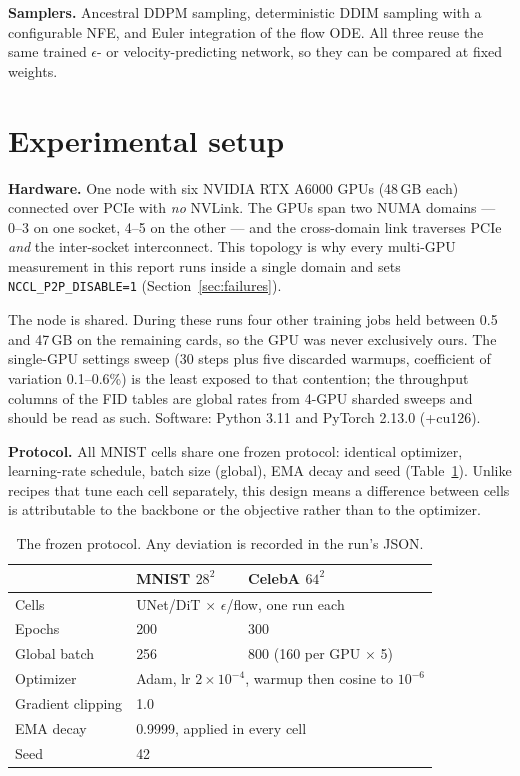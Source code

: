 \documentclass{article}
\begin{document}
\textbf{Samplers.} Ancestral DDPM sampling, deterministic DDIM sampling with a configurable
NFE, and Euler integration of the flow ODE. All three reuse the same trained \(\epsilon\)- or
velocity-predicting network, so they can be compared at fixed weights.

\section{Experimental setup}
\label{sec:setup}

\textbf{Hardware.} One node with six NVIDIA RTX A6000 GPUs (48\,GB each) connected over
PCIe with \emph{no} NVLink. The GPUs span two NUMA domains --- 0--3 on one socket, 4--5 on
the other --- and the cross-domain link traverses PCIe \emph{and} the inter-socket
interconnect. This topology is why every multi-GPU measurement in this report runs inside a
single domain and sets \texttt{NCCL\_P2P\_DISABLE=1} (Section~\ref{sec:failures}).

The node is shared. During these runs four other training jobs held between 0.5 and 47\,GB on
the remaining cards, so the GPU was never exclusively ours. The single-GPU settings sweep (30
steps plus five discarded warmups, coefficient of variation 0.1--0.6\%) is the least exposed to
that contention; the throughput columns of the FID tables are global rates from 4-GPU sharded
sweeps and should be read as such. Software: Python 3.11 and PyTorch 2.13.0 (+cu126).

\textbf{Protocol.} All MNIST cells share one frozen protocol: identical optimizer,
learning-rate schedule, batch size (global), EMA decay and seed (Table~\ref{tab:protocol}).
Unlike recipes that tune each cell separately, this design means a difference between cells
is attributable to the backbone or the objective rather than to the optimizer.

\begin{table}[t]
  \caption{The frozen protocol. Any deviation is recorded in the run's JSON.}
  \label{tab:protocol}
  \centering
  \small
  \begin{tabular}{@{}lll@{}}
    \toprule
    & MNIST $28^2$ & CelebA $64^2$ \\
    \midrule
    Cells & \multicolumn{2}{l}{UNet/DiT $\times$ $\epsilon$/flow, one run each} \\
    Epochs & 200 & 300 \\
    Global batch & 256 & 800 (160 per GPU $\times$ 5) \\
    Optimizer & \multicolumn{2}{l}{Adam, lr $2\times10^{-4}$, warmup then cosine to $10^{-6}$} \\
    Gradient clipping & \multicolumn{2}{l}{1.0} \\
    EMA decay & \multicolumn{2}{l}{0.9999, applied in every cell} \\
    Seed & \multicolumn{2}{l}{42} \\
    \bottomrule
  \end{tabular}
\end{table}
\end{document}
